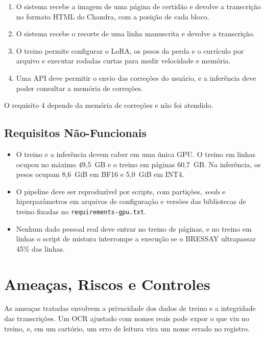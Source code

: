 \documentclass[12pt,a4paper]{article}
\begin{document}
\begin{enumerate}
    \item O sistema recebe a imagem de uma página de certidão e devolve a transcrição no formato HTML do Chandra, com a posição de cada bloco.
    \item O sistema recebe o recorte de uma linha manuscrita e devolve a transcrição.
    \item O treino permite configurar o LoRA, os pesos da perda e o currículo por arquivo e executar rodadas curtas para medir velocidade e memória.
    \item Uma API deve permitir o envio das correções do usuário, e a inferência deve poder consultar a memória de correções.
\end{enumerate}
O requisito 4 depende da memória de correções e não foi atendido.

\subsection{Requisitos Não-Funcionais}

\begin{itemize}
    \item O treino e a inferência devem caber em uma única GPU. O treino em linhas ocupou no máximo 49,5~GB e o treino em páginas 60,7~GB. Na inferência, os pesos ocupam 8,6~GiB em BF16 e 5,0~GiB em INT4.
    \item O pipeline deve ser reproduzível por scripts, com partições, \emph{seeds} e hiperparâmetros em arquivos de configuração e versões das bibliotecas de treino fixadas no \texttt{requirements-gpu.txt}.
    \item Nenhum dado pessoal real deve entrar no treino de páginas, e no treino em linhas o script de mistura interrompe a execução se o BRESSAY ultrapassar 45\% das linhas.
\end{itemize}

\section{Ameaças, Riscos e Controles}
\label{sec:threat-model}

As ameaças tratadas envolvem a privacidade dos dados de treino e a integridade das transcrições. Um OCR ajustado com nomes reais pode expor o que viu no treino, e, em um cartório, um erro de leitura vira um nome errado no registro.
\end{document}
